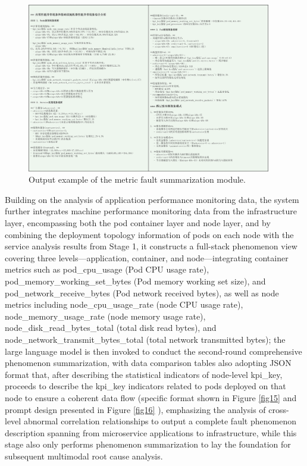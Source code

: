\documentclass[10pt]{article}
\let\oldref\ref
\renewcommand{\ref}[1]{%
    \textcolor{blue}{\oldref{#1}}%
}
\begin{document}
\begin{figure}[!t]
    \centering
    \includegraphics[width=0.95\textwidth]{fig17.png}
    \caption{Output example of the metric fault summarization module.}
    \label{fig17}
\end{figure}

Building on the analysis of application performance monitoring data, the system further integrates machine performance monitoring data from the infrastructure layer, encompassing both the pod container layer and node layer, and by combining the deployment topology information of pods on each node with the service analysis results from Stage 1, it constructs a full-stack phenomenon view covering three levels—application, container, and node—integrating container metrics such as pod\_cpu\_usage (Pod CPU usage rate), pod\_memory\_working\_set\_bytes (Pod memory working set size), and pod\_network\_receive\_bytes (Pod network received bytes), as well as node metrics including node\_cpu\_usage\_rate (node CPU usage rate), node\_memory\_usage\_rate (node memory usage rate), node\_disk\_read\_bytes\_total (total disk read bytes), and node\_network\_transmit\_bytes\_total (total network transmitted bytes); the large language model is then invoked to conduct the second-round comprehensive phenomenon summarization, with data comparison tables also adopting JSON format that, after describing the statistical indicators of node-level kpi\_key, proceeds to describe the kpi\_key indicators related to pods deployed on that node to ensure a coherent data flow (specific format shown in Figure \ref{fig15} and prompt design presented in Figure \ref{fig16}), emphasizing the analysis of cross-level abnormal correlation relationships to output a complete fault phenomenon description spanning from microservice applications to infrastructure, while this stage also only performs phenomenon summarization to lay the foundation for subsequent multimodal root cause analysis.
\end{document}
